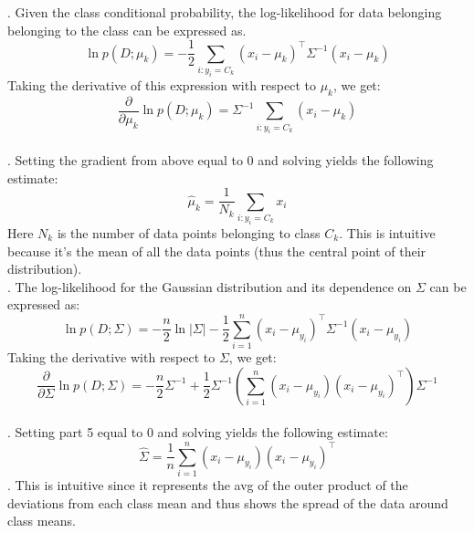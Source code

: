 \documentclass[submit]{harvardml}
\begin{document}
. Given the class conditional probability, the log-likelihood for data belonging belonging to the class can be expressed as. \[
\ln p(D; \mu_k) = -\frac{1}{2} \sum_{i: y_i = C_k} (x_i - \mu_k)^\top \Sigma^{-1} (x_i - \mu_k)
\]
Taking the derivative of this expression with respect to \(\mu_k\), we get:
\[
\frac{\partial}{\partial \mu_k} \ln p(D; \mu_k) = \Sigma^{-1} \sum_{i: y_i = C_k} (x_i - \mu_k)
\]
\\. Setting the gradient from above equal to 0 and solving yields the following estimate: \[
\hat{\mu}_k = \frac{1}{N_k} \sum_{i: y_i = C_k} x_i
\]
Here \(N_k\) is the number of data points belonging to class \(C_k\). This is intuitive because it's the mean of all the data points (thus the central point of their distribution). 
\\.  The log-likelihood for the Gaussian distribution and its dependence on \(\Sigma\) can be expressed as:
\[
\ln p(D; \Sigma) = -\frac{n}{2} \ln |\Sigma| - \frac{1}{2} \sum_{i=1}^n (x_i - \mu_{y_i})^\top \Sigma^{-1} (x_i - \mu_{y_i})
\]
Taking the derivative with respect to \(\Sigma\), we get:
\[
\frac{\partial}{\partial \Sigma} \ln p(D; \Sigma) = -\frac{n}{2} \Sigma^{-1} + \frac{1}{2} \Sigma^{-1} \left(\sum_{i=1}^n (x_i - \mu_{y_i})(x_i - \mu_{y_i})^\top\right) \Sigma^{-1}
\]
\\. Setting part 5 equal to 0 and solving yields the following estimate: \[
\hat{\Sigma} = \frac{1}{n} \sum_{i=1}^n (x_i - \mu_{y_i})(x_i - \mu_{y_i})^\top
\]. This is intuitive since it represents the avg of the outer product of the deviations from each class mean and thus shows the spread of the data around class means. 

\end{document}
